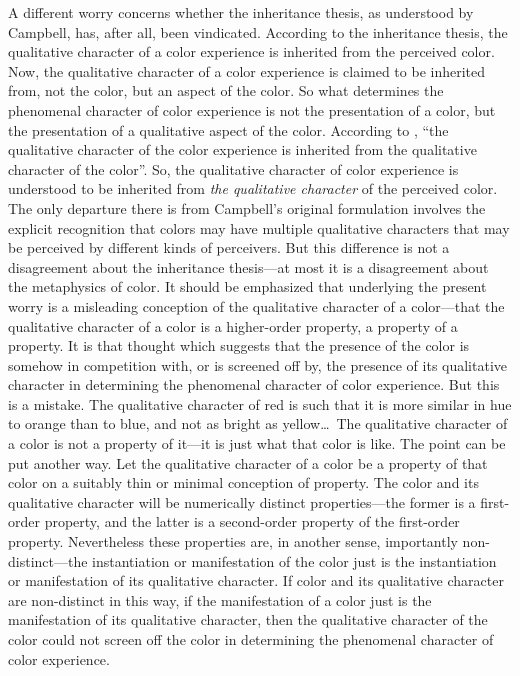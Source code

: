 \documentclass[12pt]{article}
\begin{document}
A different worry concerns whether the inheritance thesis, as understood by Campbell, has, after all, been vindicated. According to the inheritance thesis, the qualitative character of a color experience is inherited from the perceived color. Now, the qualitative character of a color experience is claimed to be inherited from, not the color, but an aspect of the color. So what determines the phenomenal character of color experience is not the presentation of a color, but the presentation of a qualitative aspect of the color. According to \citet[189]{Campbell:1997dq}, ``the qualitative character of the color experience is inherited from the qualitative character of the color''. So, the qualitative character of color experience is understood to be inherited from \emph{the qualitative character} of the perceived color. The only departure there is from Campbell's original formulation involves the explicit recognition that colors may have multiple qualitative characters that may be perceived by different kinds of perceivers. But this difference is not a disagreement about the inheritance thesis---at most it is a disagreement about the metaphysics of color. It should be emphasized that underlying the present worry is a misleading conception of the qualitative character of a color---that the qualitative character of a color is a higher-order property, a property of a property. It is that thought which suggests that the presence of the color is somehow in competition with, or is screened off by, the presence of its qualitative character in determining the phenomenal character of color experience. But this is a mistake. The qualitative character of red is such that it is more similar in hue to orange than to blue, and not as bright as yellow\ldots\ The qualitative character of a color is not a property of it---it is just what that color is like. The point can be put another way. Let the qualitative character of a color be a property of that color on a suitably thin or minimal conception of property. The color and its qualitative character will be numerically distinct properties---the former is a first-order property, and the latter is a second-order property of the first-order property. Nevertheless these properties are, in another sense, importantly non-distinct---the instantiation or manifestation of the color just is the instantiation or manifestation of its qualitative character. If color and its qualitative character are non-distinct in this way, if the manifestation of a color just is the manifestation of its qualitative character, then the qualitative character of the color could not screen off the color in determining the phenomenal character of color experience.
\end{document}
